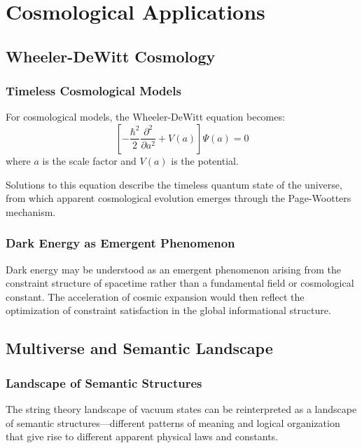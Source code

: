 \documentclass[12pt,a4paper]{article}
\begin{document}
\section{Cosmological Applications}

\subsection{Wheeler-DeWitt Cosmology}

\subsubsection{Timeless Cosmological Models}

For cosmological models, the Wheeler-DeWitt equation becomes:
\begin{equation}
    \left[-\frac{\hbar^2}{2}\frac{\partial^2}{\partial a^2} + V(a)\right]\Psi(a) = 0
\end{equation}
where $a$ is the scale factor and $V(a)$ is the potential.

Solutions to this equation describe the timeless quantum state of the universe, from which apparent cosmological evolution emerges through the Page-Wootters mechanism.

\subsubsection{Dark Energy as Emergent Phenomenon}

Dark energy may be understood as an emergent phenomenon arising from the constraint structure of spacetime rather than a fundamental field or cosmological constant. The acceleration of cosmic expansion would then reflect the optimization of constraint satisfaction in the global informational structure.

\subsection{Multiverse and Semantic Landscape}

\subsubsection{Landscape of Semantic Structures}

The string theory landscape of vacuum states can be reinterpreted as a landscape of semantic structures—different patterns of meaning and logical organization that give rise to different apparent physical laws and constants.
\end{document}
